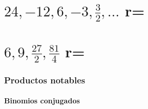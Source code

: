 \documentclass[12pt,addpoints]{repaso}
\begin{document}
\begin{questions}
{\begin{multicols}{3}
\begin{parts}
                \begin{solutionbox}{2cm}
                \end{solutionbox}

                \part {\large $24, -12, 6, -3, \frac{3}{2}, \dots$ \quad r=\fillin[$\frac{1}{2}$][0cm]}

                \begin{solutionbox}{2cm}
                \end{solutionbox}

                \part {\large $6, 9, \frac{27}{2}, \frac{81}{4}$ \quad r=\fillin[$\frac{3}{2}$][0cm]}

                \begin{solutionbox}{2cm}
                \end{solutionbox}
            \end{parts}
        \end{multicols}
    }

    \newpage
    \section*{Productos notables}
    \subsection*{Binomios conjugados}

    \ejemplosboxed[{Desarrolla los siguientes productos notables:
                \begin{multicols}{2}
                    \begin{parts}
                        \part $(x-15)(x+15)=$ \fillin[$x^2-225$][0cm]

                        \part $(9x-1)(9x+1)=$ \fillin[$81x^2-1$][0cm]

                    \end{parts}
                \end{multicols}
            }]


\end{questions}
\end{document}
